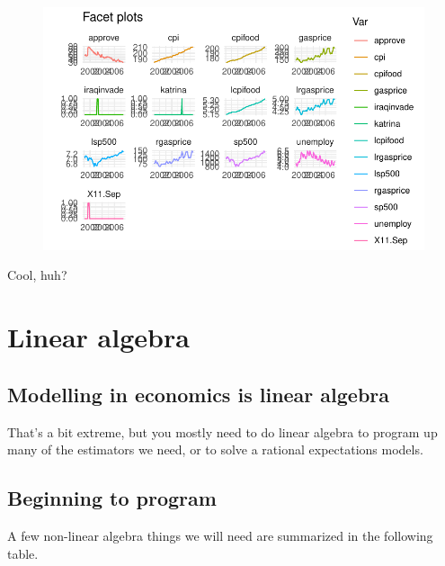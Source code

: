 \documentclass[
  letterpaper,
]{book}
\begin{document}
\begin{figure}[H]

{\centering \includegraphics{Appendix1_files/figure-pdf/unnamed-chunk-11-1.pdf}

}

\end{figure}

Cool, huh?

\hypertarget{linear-algebra}{%
\chapter{Linear algebra}\label{linear-algebra}}

\hypertarget{modelling-in-economics-is-linear-algebra}{%
\section{\texorpdfstring{Modelling in economics \textbf{is} linear
algebra}{Modelling in economics is linear algebra}}\label{modelling-in-economics-is-linear-algebra}}

That's a bit extreme, but you mostly need to do linear algebra to
program up many of the estimators we need, or to solve a rational
expectations models.

\hypertarget{beginning-to-program}{%
\section{Beginning to program}\label{beginning-to-program}}

A few non-linear algebra things we will need are summarized in the
following table.
\end{document}

